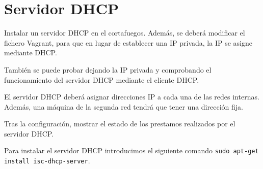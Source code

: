 \documentclass[12pt,letterpaper]{article}
\begin{document}
\section{Servidor DHCP}
Instalar un servidor DHCP en el cortafuegos. Además, se deberá modificar el fichero Vagrant, para que en lugar de establecer una IP privada, la IP se asigne mediante DHCP.

%

También se puede probar dejando la IP privada y comprobando el funcionamiento del servidor DHCP mediante el cliente DHCP.

El servidor DHCP deberá asignar direcciones IP a cada una de las redes internas. Además, una máquina de la segunda red tendrá que tener una dirección fija.

Tras la configuración, mostrar el estado de los prestamos realizados por el servidor DHCP.

Para instalar el servidor DHCP introducimos el siguiente comando \texttt{sudo apt-get install isc-dhcp-server}.
\end{document}
